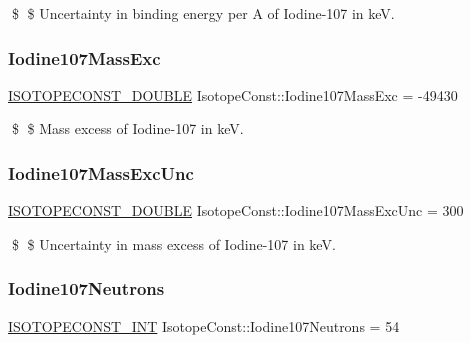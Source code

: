 \$ \$ Uncertainty in binding energy per A of Iodine-\/107 in keV. \mbox{\label{group___isotope_const-_iodine-_i107_gad7959bfd6b2ee73d578870867ec7cc97}} 
\subsubsection{\texorpdfstring{Iodine107\+Mass\+Exc}{Iodine107MassExc}}
{\footnotesize\ttfamily \mbox{\hyperlink{group___isotope_const-_macros_ga8f45a7272ce02c0b4c65c44636ed719a}{I\+S\+O\+T\+O\+P\+E\+C\+O\+N\+S\+T\+\_\+\+D\+O\+U\+B\+LE}} Isotope\+Const\+::\+Iodine107\+Mass\+Exc = -\/49430}

\$ \$ Mass excess of Iodine-\/107 in keV. \mbox{\label{group___isotope_const-_iodine-_i107_ga8dc81be9e0fd7cfb99f8edb0fe81878c}} 
\subsubsection{\texorpdfstring{Iodine107\+Mass\+Exc\+Unc}{Iodine107MassExcUnc}}
{\footnotesize\ttfamily \mbox{\hyperlink{group___isotope_const-_macros_ga8f45a7272ce02c0b4c65c44636ed719a}{I\+S\+O\+T\+O\+P\+E\+C\+O\+N\+S\+T\+\_\+\+D\+O\+U\+B\+LE}} Isotope\+Const\+::\+Iodine107\+Mass\+Exc\+Unc = 300}

\$ \$ Uncertainty in mass excess of Iodine-\/107 in keV. \mbox{\label{group___isotope_const-_iodine-_i107_gafe3f6bcc045cc61716a012df3605f8cb}} 
\subsubsection{\texorpdfstring{Iodine107\+Neutrons}{Iodine107Neutrons}}
{\footnotesize\ttfamily \mbox{\hyperlink{group___isotope_const-_macros_ga5f18360b3e99483a35c32d789e62621c}{I\+S\+O\+T\+O\+P\+E\+C\+O\+N\+S\+T\+\_\+\+I\+NT}} Isotope\+Const\+::\+Iodine107\+Neutrons = 54}


